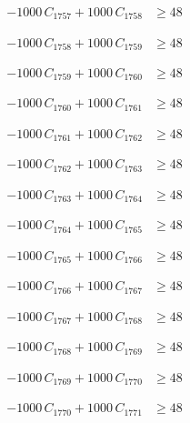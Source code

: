 \documentclass[a4paper,11pt]{article}
\begin{document}
\begin{align}
-1000\,C_{1757} + 1000\,C_{1758} &\geq 48 \nonumber
\end{align}

\begin{align}
-1000\,C_{1758} + 1000\,C_{1759} &\geq 48 \nonumber
\end{align}

\begin{align}
-1000\,C_{1759} + 1000\,C_{1760} &\geq 48 \nonumber
\end{align}

\begin{align}
-1000\,C_{1760} + 1000\,C_{1761} &\geq 48 \nonumber
\end{align}

\begin{align}
-1000\,C_{1761} + 1000\,C_{1762} &\geq 48 \nonumber
\end{align}

\begin{align}
-1000\,C_{1762} + 1000\,C_{1763} &\geq 48 \nonumber
\end{align}

\begin{align}
-1000\,C_{1763} + 1000\,C_{1764} &\geq 48 \nonumber
\end{align}

\begin{align}
-1000\,C_{1764} + 1000\,C_{1765} &\geq 48 \nonumber
\end{align}

\begin{align}
-1000\,C_{1765} + 1000\,C_{1766} &\geq 48 \nonumber
\end{align}

\begin{align}
-1000\,C_{1766} + 1000\,C_{1767} &\geq 48 \nonumber
\end{align}

\begin{align}
-1000\,C_{1767} + 1000\,C_{1768} &\geq 48 \nonumber
\end{align}

\begin{align}
-1000\,C_{1768} + 1000\,C_{1769} &\geq 48 \nonumber
\end{align}

\begin{align}
-1000\,C_{1769} + 1000\,C_{1770} &\geq 48 \nonumber
\end{align}

\begin{align}
-1000\,C_{1770} + 1000\,C_{1771} &\geq 48 \nonumber
\end{align}
\end{document}
